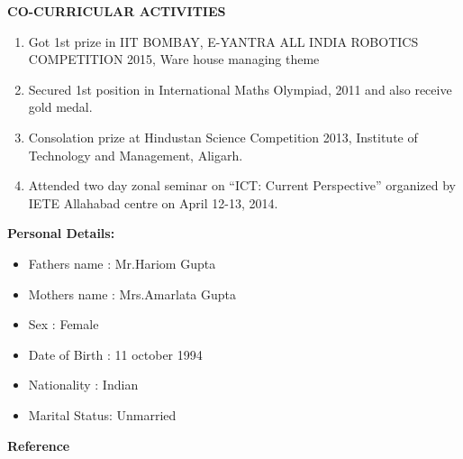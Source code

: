 \documentclass[10pt]{article}
\begin{document}
		\textbf{CO-CURRICULAR ACTIVITIES}\\
		\begin{enumerate}
	\item 	Got 1st prize in IIT BOMBAY, E-YANTRA ALL INDIA ROBOTICS COMPETITION 2015,
	Ware house managing theme 
	\item 	Secured 1st position in International Maths Olympiad, 2011 and also receive gold medal.
	\item 	Consolation prize at Hindustan Science Competition 2013, Institute of Technology and Management, Aligarh.
	\item 	Attended two day zonal seminar on “ICT: Current Perspective” organized by IETE Allahabad centre on April 12-13, 2014.
	
		\end{enumerate}
		\textbf{Personal Details:}\\
		\begin{itemize}
			\item Fathers name : Mr.Hariom Gupta
			\item Mothers name : Mrs.Amarlata Gupta
			\item Sex          : Female
			\item Date of Birth : 11 october 1994
			\item Nationality : Indian
			\item Marital Status: Unmarried
	    \end{itemize}
	    \textbf{Reference}\\ \\ \\
	
\end{document}
